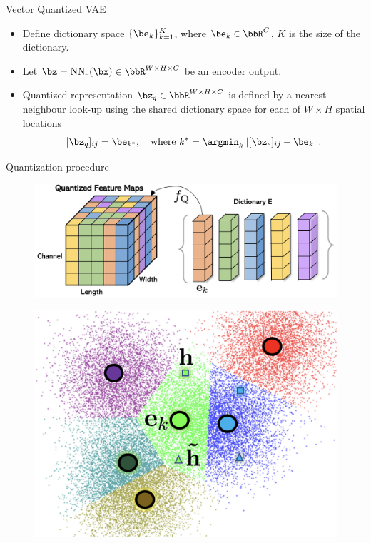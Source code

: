 \begin{frame}{Vector Quantized VAE}
	\begin{itemize}
		\item Define dictionary space $\{\be_k\}_{k=1}^K$, where $\be_k \in \bbR^C$, $K$ is the size of the dictionary.
		\item Let $\bz = \text{NN}_\text{e}(\bx) \in \bbR^{W \times H \times C}$ be an encoder output.
		\item Quantized representation $\bz_q \in \bbR^{W \times H \times C}$ is defined by a nearest neighbour look-up using the shared dictionary space for each of $W \times H$ spatial locations
		\vspace{-0.2cm}
		\[
			[\bz_q]_{ij} = \be_{k^*}, \quad \text{where } k^* = \argmin_k \| [\bz_e]_{ij} - \be_k \|.
		\] 
	\end{itemize}
	\vspace{-0.6cm}
	\begin{block}{Quantization procedure}
		\begin{minipage}[t]{0.65\columnwidth}
			\begin{figure}
				\includegraphics[width=\linewidth]{figs/fqgan_cnn.png}
			\end{figure}
		\end{minipage}%
		\begin{minipage}[t]{0.35\columnwidth}
			\begin{figure}
				\includegraphics[width=0.9\linewidth]{figs/fqgan_lookup}
			\end{figure}
		\end{minipage}
	\end{block}

\end{frame}
